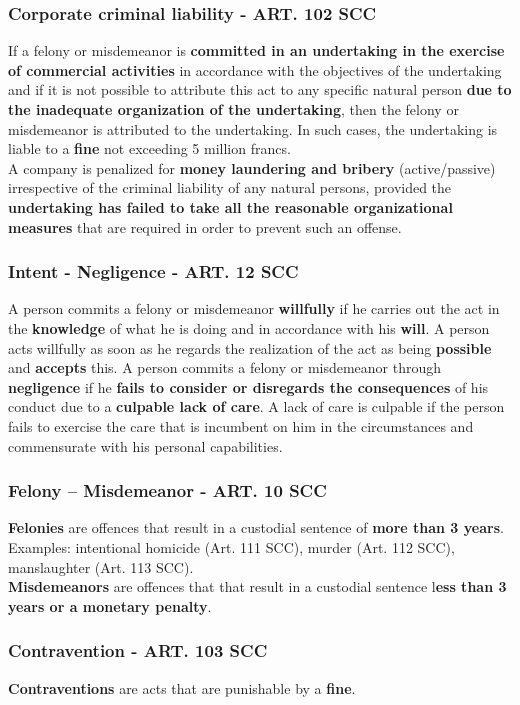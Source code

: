 \subsubsection{Corporate criminal liability - ART. 102 SCC}
If a felony or misdemeanor is \textbf{committed in an undertaking in the exercise of commercial activities} in accordance with the objectives of the undertaking and if it is not possible to attribute this act to any specific natural person \textbf{due to the inadequate organization of the undertaking}, then the felony or misdemeanor is attributed to the undertaking. In such cases, the undertaking is liable to a \textbf{fine} not exceeding 5 million francs.\\
A company is penalized for \textbf{money laundering and bribery} (active/passive) irrespective of the criminal liability of any natural persons, provided the \textbf{undertaking has failed to take all the reasonable organizational measures} that are required in order to prevent such an offense.

\subsubsection{Intent - Negligence - ART. 12 SCC}
A person commits a felony or misdemeanor \textbf{willfully} if he carries out the act in the \textbf{knowledge} of what he is doing and in accordance with his \textbf{will}. A person acts willfully as soon as he regards the realization of the act as being \textbf{possible} and \textbf{accepts} this. A person commits a felony or misdemeanor through \textbf{negligence} if he \textbf{fails to consider or disregards the consequences} of his conduct due to a \textbf{culpable lack of care}. A lack of care is culpable if the person fails to exercise the care that is incumbent on him in the circumstances and commensurate with his personal capabilities.

\subsubsection{Felony – Misdemeanor - ART. 10 SCC}
\textbf{Felonies} are offences that result in a custodial sentence of \textbf{more than 3 years}. Examples: intentional homicide (Art. 111 SCC), murder (Art. 112 SCC), manslaughter (Art. 113 SCC). \\
\textbf{Misdemeanors} are offences that that result in a custodial sentence l\textbf{ess than 3 years or a monetary penalty}.

\subsubsection{Contravention - ART. 103 SCC}
\textbf{Contraventions} are acts that are punishable by a \textbf{fine}.

